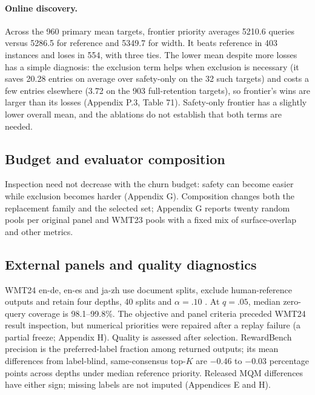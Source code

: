 \documentclass[11pt]{article}
\begin{document}
\paragraph{Online discovery.} Across the 960 primary mean targets, frontier priority averages 5210.6 queries versus 5286.5 for reference and 5349.7 for width. It beats reference in 403 instances and loses in 554, with three ties. The lower mean despite more losses has a simple diagnosis: the exclusion term helps when exclusion is necessary (it saves 20.28 entries on average over safety-only on the 32 such targets) and costs a few entries elsewhere (3.72 on the 903 full-retention targets), so frontier's wins are larger than its losses (Appendix P.3, Table 71). Safety-only frontier has a slightly lower overall mean, and the ablations do not establish that both terms are needed.

\subsection{Budget and evaluator composition}
\label{sec:composition}
Inspection need not decrease with the churn budget: safety can become easier while exclusion becomes harder (Appendix G). Composition changes both the replacement family and the selected set; Appendix G reports twenty random pools per original panel and WMT23 pools with a fixed mix of surface-overlap and other metrics.

\subsection{External panels and quality diagnostics}
WMT24 en-de, en-es and ja-zh use document splits, exclude human-reference outputs and retain four depths, 40 splits and $\alpha=.10$ \citep{freitag2024wmt24}. At $q=.05$, median zero-query coverage is 98.1--99.8\%. The objective and panel criteria preceded WMT24 result inspection, but numerical priorities were repaired after a replay failure (a partial freeze; Appendix H). Quality is assessed after selection. RewardBench precision is the preferred-label fraction among returned outputs; its mean differences from label-blind, same-consensus top-$K$ are $-0.46$ to $-0.03$ percentage points across depths under median reference priority. Released MQM differences have either sign; missing labels are not imputed (Appendices E and H).
\end{document}
